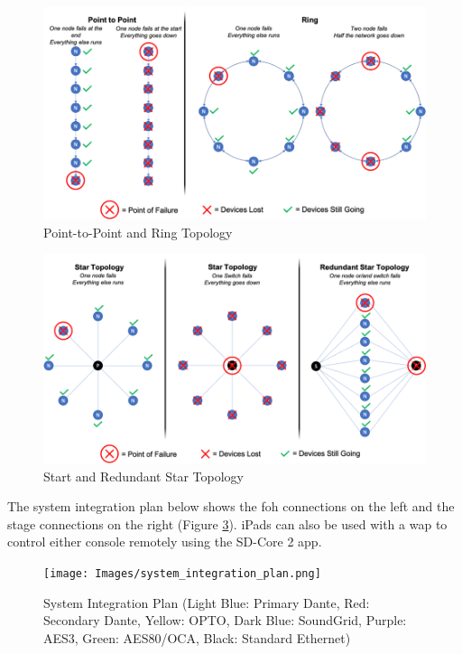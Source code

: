         \begin{figure}[H]
            \centering
            \includegraphics[width=1\linewidth]{Images/bad_topologies.png}
            \caption{Point-to-Point and Ring Topology}
            \label{fig:bad_topologies}
        \end{figure}

        \begin{figure}[H]
            \centering
            \includegraphics[width=1\linewidth]{Images/redundant_star_topology.png}
            \caption{Start and Redundant Star Topology}
            \label{fig:redundant_star_topology}
        \end{figure}
        
        The system integration plan below shows the \gls{foh} connections on the left and the stage connections on the right (Figure \ref{fig:system_integration_plan}). iPads can also be used with a \gls{wap} to control either console remotely using the SD-Core 2 app.
        
        \begin{figure}[H]
            \centering
            \texttt{[image: Images/system\_integration\_plan.png]}
            \caption{System Integration Plan (Light Blue: Primary Dante, Red: Secondary Dante, Yellow: OPTO, Dark Blue: SoundGrid, Purple: AES3, Green: AES80/OCA, Black: Standard Ethernet)}
            \label{fig:system_integration_plan}
        \end{figure}

